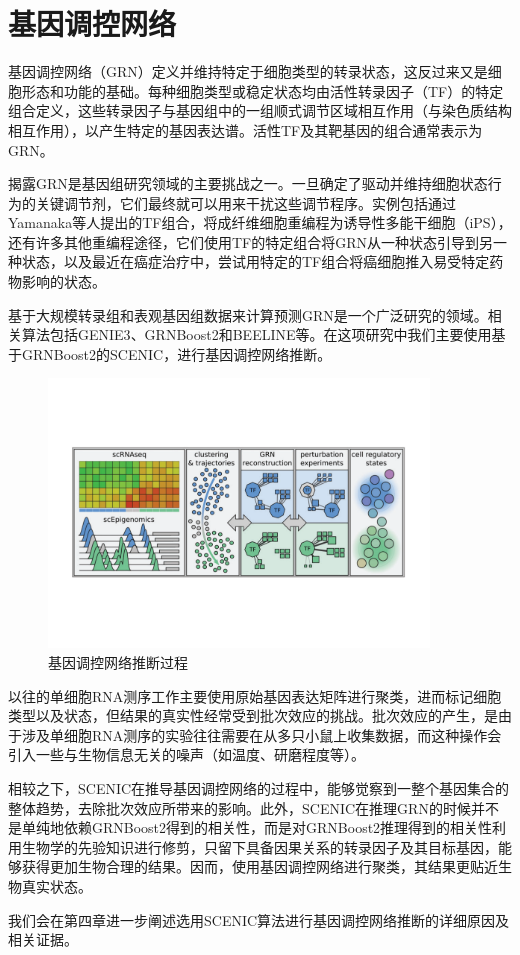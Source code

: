 \section{基因调控网络}

  基因调控网络（GRN）定义并维持特定于细胞类型的转录状态，这反过来又是细胞形态和功能的基础。每种细胞类型或稳定状态均由活性转录因子（TF）的特定组合定义，这些转录因子与基因组中的一组顺式调节区域相互作用（与染色质结构相互作用），以产生特定的基因表达谱\cite{fiers2018mapping,arendt2016origin}。活性TF及其靶基因的组合通常表示为GRN。

  揭露GRN是基因组研究领域的主要挑战之一。一旦确定了驱动并维持细胞状态行为的关键调节剂，它们最终就可以用来干扰这些调节程序。实例包括通过Yamanaka等人\cite{takahashi2006induction}提出的TF组合，将成纤维细胞重编程为诱导性多能干细胞（iPS），还有许多其他重编程途径，它们使用TF的特定组合将GRN从一种状态引导到另一种状态\cite{marro2011direct,ieda2010direct}，以及最近在癌症治疗中，尝试用特定的TF组合将癌细胞推入易受特定药物影响的状态\cite{creixell2012navigating,wouters2017decoding}。

  基于大规模转录组和表观基因组数据来计算预测GRN是一个广泛研究的领域。相关算法包括GENIE3\cite{huynh2010inferring}、GRNBoost2\cite{moerman2019grnboost2}和BEELINE\cite{pratapa2020benchmarking}等。在这项研究中我们主要使用基于GRNBoost2的SCENIC\cite{aibar2017scenic,van2020scalable}，进行基因调控网络推断。

\begin{figure}[!htb]
  \centering
  \includegraphics[width=0.9\textwidth]{figs/scgrn-infer.pdf}
  \caption{基因调控网络推断过程}
  \label{fig:scgrn-infer}
\end{figure}

  以往的单细胞RNA测序工作主要使用原始基因表达矩阵进行聚类，进而标记细胞类型以及状态，但结果的真实性经常受到批次效应的挑战。批次效应的产生，是由于涉及单细胞RNA测序的实验往往需要在从多只小鼠上收集数据，而这种操作会引入一些与生物信息无关的噪声（如温度、研磨程度等）。

  相较之下，SCENIC在推导基因调控网络的过程中，能够觉察到一整个基因集合的整体趋势，去除批次效应所带来的影响。此外，SCENIC在推理GRN的时候并不是单纯地依赖GRNBoost2得到的相关性，而是对GRNBoost2推理得到的相关性利用生物学的先验知识进行修剪，只留下具备因果关系的转录因子及其目标基因，能够获得更加生物合理的结果。因而，使用基因调控网络进行聚类，其结果更贴近生物真实状态。

  我们会在第四章进一步阐述选用SCENIC算法进行基因调控网络推断的详细原因及相关证据。

